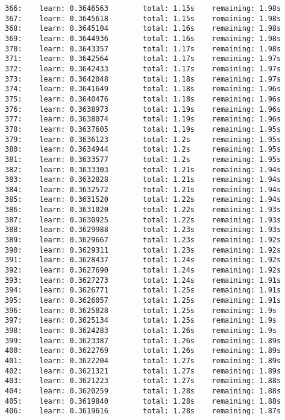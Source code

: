 \documentclass[11pt]{article}
\begin{document}
\begin{Verbatim}[commandchars=\\\{\}]
366:    learn: 0.3646563        total: 1.15s    remaining: 1.98s
367:    learn: 0.3645618        total: 1.15s    remaining: 1.98s
368:    learn: 0.3645104        total: 1.16s    remaining: 1.98s
369:    learn: 0.3644936        total: 1.16s    remaining: 1.98s
370:    learn: 0.3643357        total: 1.17s    remaining: 1.98s
371:    learn: 0.3642564        total: 1.17s    remaining: 1.97s
372:    learn: 0.3642433        total: 1.17s    remaining: 1.97s
373:    learn: 0.3642048        total: 1.18s    remaining: 1.97s
374:    learn: 0.3641649        total: 1.18s    remaining: 1.96s
375:    learn: 0.3640476        total: 1.18s    remaining: 1.96s
376:    learn: 0.3638973        total: 1.19s    remaining: 1.96s
377:    learn: 0.3638074        total: 1.19s    remaining: 1.96s
378:    learn: 0.3637605        total: 1.19s    remaining: 1.95s
379:    learn: 0.3636123        total: 1.2s     remaining: 1.95s
380:    learn: 0.3634944        total: 1.2s     remaining: 1.95s
381:    learn: 0.3633577        total: 1.2s     remaining: 1.95s
382:    learn: 0.3633303        total: 1.21s    remaining: 1.94s
383:    learn: 0.3632828        total: 1.21s    remaining: 1.94s
384:    learn: 0.3632572        total: 1.21s    remaining: 1.94s
385:    learn: 0.3631520        total: 1.22s    remaining: 1.94s
386:    learn: 0.3631020        total: 1.22s    remaining: 1.93s
387:    learn: 0.3630925        total: 1.22s    remaining: 1.93s
388:    learn: 0.3629988        total: 1.23s    remaining: 1.93s
389:    learn: 0.3629667        total: 1.23s    remaining: 1.92s
390:    learn: 0.3629311        total: 1.23s    remaining: 1.92s
391:    learn: 0.3628437        total: 1.24s    remaining: 1.92s
392:    learn: 0.3627690        total: 1.24s    remaining: 1.92s
393:    learn: 0.3627273        total: 1.24s    remaining: 1.91s
394:    learn: 0.3626771        total: 1.25s    remaining: 1.91s
395:    learn: 0.3626057        total: 1.25s    remaining: 1.91s
396:    learn: 0.3625828        total: 1.25s    remaining: 1.9s
397:    learn: 0.3625134        total: 1.25s    remaining: 1.9s
398:    learn: 0.3624283        total: 1.26s    remaining: 1.9s
399:    learn: 0.3623387        total: 1.26s    remaining: 1.89s
400:    learn: 0.3622769        total: 1.26s    remaining: 1.89s
401:    learn: 0.3622204        total: 1.27s    remaining: 1.89s
402:    learn: 0.3621321        total: 1.27s    remaining: 1.89s
403:    learn: 0.3621223        total: 1.27s    remaining: 1.88s
404:    learn: 0.3620259        total: 1.28s    remaining: 1.88s
405:    learn: 0.3619840        total: 1.28s    remaining: 1.88s
406:    learn: 0.3619616        total: 1.28s    remaining: 1.87s

\end{Verbatim}
\end{document}

